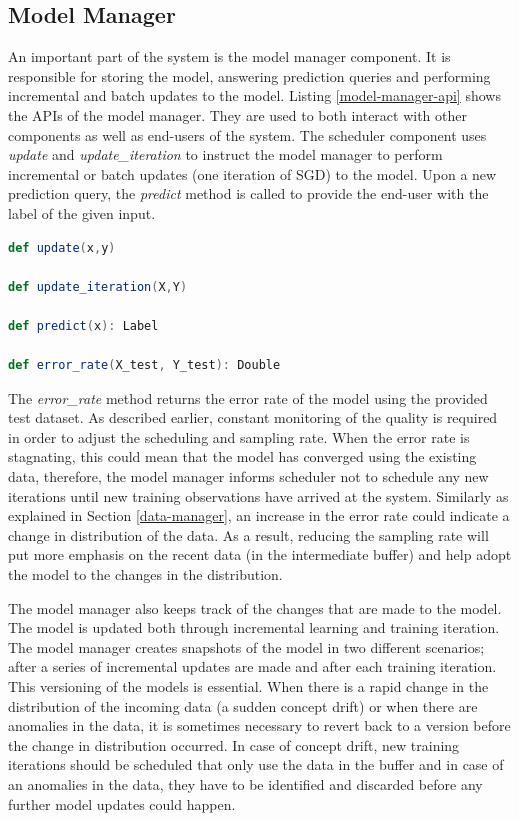 \documentclass{vldb}
\begin{document}
\subsection{Model Manager} \label{model-manager} 
An important part of the system is the model manager component.
It is responsible for storing the model, answering prediction queries and performing incremental and batch updates to the model.
Listing \ref{model-manager-api} shows the APIs of the model manager.
They are used to both interact with other components as well as end-users of the system.
The scheduler component uses \textit{update} and \textit{update\_iteration} to instruct the model manager to perform incremental or batch updates (one iteration of SGD) to the model.
Upon a new prediction query, the \textit{predict} method is called to provide the end-user with the label of the given input.\\
\noindent\hspace{-0.1\linewidth}\begin{minipage}[t]{\linewidth}
\begin{lstlisting}[language=Scala, basicstyle=\small\ttfamily, frame=tb ,columns=fullflexible,
showstringspaces=false,label=model-manager-api,caption=Model Manager API, numberstyle=\tiny]
def update(x,y)

def update_iteration(X,Y)

def predict(x): Label

def error_rate(X_test, Y_test): Double

\end{lstlisting}
\end{minipage}


The \textit{error\_rate} method returns the error rate of the model using the provided test dataset.
As described earlier, constant monitoring of the quality is required in order to adjust the scheduling and sampling rate.
When the error rate is stagnating, this could mean that the model has converged using the existing data, therefore, the model manager informs scheduler not to schedule any new iterations until new training observations have arrived at the system.
Similarly as explained in Section \ref{data-manager}, an increase in the error rate could indicate a change in distribution of the data.
As a result, reducing the sampling rate will put more emphasis on the recent data (in the intermediate buffer) and help adopt the model to the changes in the distribution.

The model manager also keeps track of the changes that are made to the model.
The model is updated both through incremental learning and training iteration.
The model manager creates snapshots of the model in two different scenarios; after a series of incremental updates are made and after each training iteration.
This versioning of the models is essential.
When there is a rapid change in the distribution of the incoming data (a sudden concept drift) or when there are anomalies in the data, it is sometimes necessary to revert back to a version before the change in distribution occurred.
In case of concept drift, new training iterations should be scheduled that only use the data in the buffer and in case of an anomalies in the data, they have to be identified and discarded before any further model updates could happen.
\end{document}
